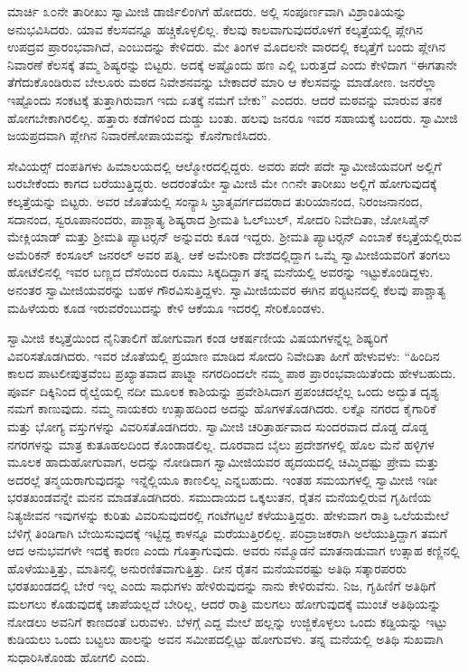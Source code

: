  ಮಾರ್ಚಿ ೩೦ನೇ ತಾರೀಖು ಸ್ವಾಮೀಜಿ ಡಾರ್ಜಿಲಿಂಗಿಗೆ ಹೋದರು. ಅಲ್ಲಿ ಸಂಪೂರ್ಣವಾಗಿ ವಿಶ್ರಾಂತಿಯನ್ನು ಅನುಭವಿಸಿದರು. ಯಾವ ಕೆಲಸವನ್ನೂ ಹಚ್ಚಿಕೊಳ್ಳಲಿಲ್ಲ. ಕೆಲವು ಕಾಲವಾಗುವುದರೊಳಗೆ ಕಲ್ಕತ್ತೆಯಲ್ಲಿ ಪ್ಲೇಗಿನ ಉಪದ್ರವ ಪ್ರಾರಂಭವಾಗಿದೆ, ಎಂಬುದನ್ನು ಕೇಳಿದರು. ಮೇ ತಿಂಗಳ ಮೊದಲನೇ ವಾರದಲ್ಲಿ ಕಲ್ಕತ್ತೆಗೆ ಬಂದು ಪ್ಲೇಗಿನ ನಿವಾರಣೆ ಕೆಲಸಕ್ಕೆ ತಮ್ಮ ಶಿಷ್ಯರನ್ನು ಬಿಟ್ಟರು. ಅದಕ್ಕೆ ಅಷ್ಟೊಂದು ಹಣ ಎಲ್ಲಿ ಬರುತ್ತದೆ ಎಂದು ಕೇಳಿದಾಗ “ಈಗತಾನೇ ತೆಗೆದುಕೊಂಡಿರುವ ಬೇಲೂರು ಮಠದ ನಿವೇಶನವನ್ನು ಬೇಕಾದರೆ ಮಾರಿ ಆ ಕೆಲಸವನ್ನು ಮಾಡೋಣ. ಜನರೆಲ್ಲಾ ಇಷ್ಟೊಂದು ಸಂಕಟಕ್ಕೆ ತುತ್ತಾಗಿರುವಾಗ ಇದು ಏತಕ್ಕೆ ನಮಗೆ ಬೇಕು” ಎಂದರು. ಆದರೆ ಮಠವನ್ನು ಮಾರುವ ತನಕ ಹೋಗಬೇಕಾಗಿರಲಿಲ್ಲ. ಹತ್ತಾರು ಕಡೆಗಳಿಂದ ದುಡ್ಡು ಬಂತು. ಹಲವು ಜನರೂ ಇವರ ಸಹಾಯಕ್ಕೆ ಬಂದರು. ಸ್ವಾಮೀಜಿ ಜಯಪ್ರದವಾಗಿ ಪ್ಲೇಗಿನ ನಿವಾರಣೋಪಾಯವನ್ನು ಕೊನೆಗಾಣಿಸಿದರು. 

 ಸೇವಿಯರ್ಸ್‍‍ ದಂಪತಿಗಳು ಹಿಮಾಲಯದಲ್ಲಿ ಆಲ್ಮೋರದಲ್ಲಿದ್ದರು. ಅವರು ಪದೇ ಪದೇ ಸ್ವಾಮೀಜಿಯವರಿಗೆ ಅಲ್ಲಿಗೆ ಬರಬೇಕೆಂದು ಕಾಗದ ಬರೆಯುತ್ತಿದ್ದರು. ಅದರಂತೆಯೇ ಸ್ವಾಮೀಜಿ ಮೇ ೧೧ನೇ ತಾರೀಖು ಅಲ್ಲಿಗೆ ಹೋಗುವುದಕ್ಕೆ ಕಲ್ಕತ್ತೆಯನ್ನು ಬಿಟ್ಟರು. ಅವರ ಜೊತೆಯಲ್ಲಿ ಸಂನ್ಯಾಸಿ ಭ್ರಾತೃವರ್ಗದವರಾದ ತುರಿಯಾನಂದ, ನಿರಂಜನಾನಂದ, ಸದಾನಂದ, ಸ್ವರೂಪಾನಂದರು, ಪಾಶ್ಚಾತ್ಯ ಶಿಷ್ಯರಾದ ಶ‍್ರೀಮತಿ ಓಲ್‍ಬುಲ್, ಸೋದರಿ ನಿವೇದಿತಾ, ಜೋಸಿಪೈನ್ ಮೇಕ್ಲಿಯಾಡ್ ಮತ್ತು ಶ‍್ರೀಮತಿ ಪ್ಯಾಟರ್‍ಸನ್ ಅನ್ನುವರು ಕೂಡ ಇದ್ದರು. ಶ‍್ರೀಮತಿ ಪ್ಯಾಟರ್‍ಸನ್ ಎಂಬಾಕೆ ಕಲ್ಕತ್ತೆಯಲ್ಲಿರುವ ಅಮೆರಿಕನ್ ಕಂಸೂಲ್ ಜನರಲ್ ಅವರ ಪತ್ನಿ. ಆಕೆ ಅಮೇರಿಕಾ ದೇಶದಲ್ಲಿದ್ದಾಗ ಒಮ್ಮೆ ಸ್ವಾಮೀಜಿಯವರಿಗೆ ತಂಗಲು ಹೋಟೆಲಿನಲ್ಲಿ ಇವರ ಬಣ್ಣದ ದೆಸೆಯಿಂದ ರೂಮು ಸಿಕ್ಕದಿದ್ದಾಗ ತನ್ನ ಮನೆಯಲ್ಲಿ ಅವರನ್ನು ಇಟ್ಟುಕೊಂಡಿದ್ದಳು. ಅನಂತರ ಸ್ವಾಮೀಜಿಯವರನ್ನು ಬಹಳ ಗೌರವಿಸುತ್ತಿದ್ದಳು. ಸ್ವಾಮೀಜಿಯವರ ಈಗಿನ ಪರ‍್ಯಟನದಲ್ಲಿ ಕೆಲವು ಪಾಶ್ಚಾತ್ಯ ಮಹಿಳೆಯರು ಕೂಡ ಇರುವರೆಂಬುದನ್ನು ಕೇಳಿ ಆಕೆಯೂ ಇದರಲ್ಲಿ ಸೇರಿಕೊಂಡಳು. 

 ಸ್ವಾಮೀಜಿ ಕಲ್ಕತ್ತೆಯಿಂದ ನೈನಿತಾಲಿಗೆ ಹೋಗುವಾಗ ಕಂಡ ಆಕರ್ಷಣೀಯ ವಿಷಯಗಳನ್ನೆಲ್ಲ ಶಿಷ್ಯರಿಗೆ ವಿವರಿಸತೊಡಗಿದರು. ಇವರ ಜೊತೆಯಲ್ಲಿ ಪ್ರಯಾಣ ಮಾಡಿದ ಸೋದರಿ ನಿವೇದಿತಾ ಹೀಗೆ ಹೇಳುವಳು: “ಹಿಂದಿನ ಕಾಲದ ಪಾಟಲೀಪುತ್ರವೆಂಬ ಪ್ರಖ್ಯಾತವಾದ ಪಾಟ್ನಾ ನಗರದಿಂದಲೇ ನಮ್ಮ ಪಾಠ ಪ್ರಾರಂಭವಾಯಿತೆಂದು ಹೇಳಬಹುದು. ಪೂರ್ವ ದಿಕ್ಕಿನಿಂದ ರೈಲ್ವೆಯಲ್ಲಿ ನದೀ ಮೂಲಕ ಕಾಶಿಯನ್ನು ಪ್ರವೇಶಿಸಿದಾಗ ಪ್ರಪಂಚದಲ್ಲೆಲ್ಲ ಒಂದು ಅದ್ಭುತ ದೃಶ್ಯ ನಮಗೆ ಕಾಣುವುದು. ನಮ್ಮ ನಾಯಕರು ಉತ್ಸಾಹದಿಂದ ಅದನ್ನು ಹೊಗಳತೊಡಗಿದರು. ಲಕ್ನೊ ನಗರದ ಕೈಗಾರಿಕೆ ಮತ್ತು ಭೋಗ್ಯ ವಸ್ತುಗಳನ್ನು ವಿವರಿಸತೊಡಗಿದರು. ಸ್ವಾಮೀಜಿ ಚರಿತ್ರಾರ್ಹವಾದ ಸುಂದರವಾದ ದೊಡ್ಡ ದೊಡ್ಡ ನಗರಗಳನ್ನು ಮಾತ್ರ ಕುತೂಹಲದಿಂದ ಕೊಂಡಾಡಲಿಲ್ಲ. ದೂರವಾದ ಬೈಲು ಪ್ರದೇಶಗಳಲ್ಲಿ ಹೊಲ ಮೆನೆ ಹಳ್ಳಿಗಳ ಮೂಲಕ ಹಾದುಹೋಗುವಾಗ, ಅದನ್ನು ನೋಡಿದಾಗ ಸ್ವಾಮೀಜಿಯವರ ಹೃದಯದಲ್ಲಿ ಚಿಮ್ಮಿದಷ್ಟು ಪ್ರೇಮ ಮತ್ತು ಅದರಲ್ಲೆ ತನ್ಮಯರಾಗುವುದನ್ನು ಇನ್ನೆಲ್ಲಿಯೂ ಕಾಣಲಿಲ್ಲ ಎನ್ನಬಹುದು. ಇಂತಹ ಸಮಯಗಳಲ್ಲಿ ಸ್ವಾಮೀಜಿ ಇಡೀ ಭರತಖಂಡವನ್ನೇ ಮನನ ಮಾಡತೊಡಗಿದರು. ಸಮುದಾಯದ ಒಕ್ಕಲುತನ, ರೈತನ ಮನೆಯಲ್ಲಿರುವ ಗೃಹಿಣಿಯ ನಿತ್ಯಜೀವನ ಇವುಗಳನ್ನು ಕುರಿತು ವಿವರಿಸುವುದರಲ್ಲಿ ಗಂಟೆಗಟ್ಟಲೆ ಕಳೆಯುತ್ತಿದ್ದರು. ಹೇಳುವಾಗ ರಾತ್ರಿ ಒಲೆಯಮೇಲೆ ಬೆಳಿಗ್ಗೆ ತಿಂಡಿಗಾಗಿ ಬೇಯಿಸುವುದಕ್ಕೆ ಇಟ್ಟಿದ್ದ ಕಾಳನ್ನೂ ಮರೆಯುತ್ತಿರಲಿಲ್ಲ. ಪರಿವ್ರಾಜಕರಾಗಿ ಅಲೆಯುತ್ತಿದ್ದಾಗ ತಮಗೆ ಆದ ಅನುಭವಗಳೇ ಇದಕ್ಕೆ ಕಾರಣ ಎಂದು ಗೊತ್ತಾಗುವುದು. ಅವರು ನಮ್ಮೊಡನೆ ಮಾತನಾಡುವಾಗ ಉತ್ಸಾಹ ಕಣ್ಣಿನಲ್ಲಿ ಹೊಳೆಯುತ್ತಿತ್ತು, ಮಾತಿನಲ್ಲಿ ಅನುರಣಿತವಾಗುತ್ತಿತ್ತು. ದೀನ ರೈತನ ಮನೆಯವರಷ್ಟು ಅತಿಥಿ ಸತ್ಕಾರಪರರು ಭರತಖಂಡದಲ್ಲಿ ಬೇರೆ ಇಲ್ಲ ಎಂದು ಸಾಧುಗಳು ಹೇಳಿರುವುದನ್ನು ನಾನು ಕೇಳಿರುವೆನು. ನಿಜ, ಗೃಹಿಣಿಗೆ ಅತಿಥಿಗೆ ಮಲಗಲು ಕೊಡುವುದಕ್ಕೆ ಚಾಪೆಯಲ್ಲದೆ ಬೇರಿಲ್ಲ, ಆದರೆ ರಾತ್ರಿ ಮಲಗಲು ಹೋಗುವುದಕ್ಕೆ ಮುಂಚೆ ಅತಿಥಿಯನ್ನು ನೋಡಲು ಅವನಿಗೆ ಕಾಣದಂತೆ ಬರುವಳು. ಬೆಳಗ್ಗೆ ಎದ್ದ ಮೇಲೆ ಹಲ್ಲನ್ನು ಉಜ್ಜಿಕೊಳ್ಳಲು ಒಂದು ಕಡ್ಡಿಯನ್ನು ಇಟ್ಟು ಕುಡಿಯಲು ಒಂದು ಬಟ್ಟಲು ಹಾಲನ್ನು ಅವನ ಸಮೀಪದಲ್ಲಿಟ್ಟು ಹೋಗುವಳು. ತನ್ನ ಮನೆಯಲ್ಲಿ ಅತಿಥಿ ಸುಖವಾಗಿ ಸುಧಾರಿಸಿಕೊಂಡು ಹೋಗಲಿ ಎಂದು. 


